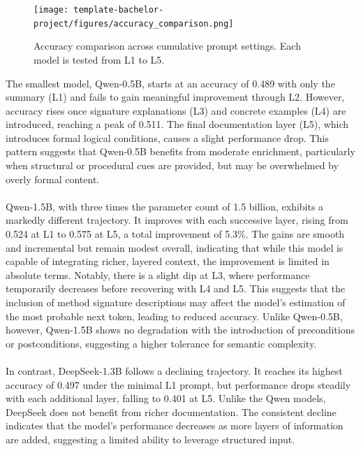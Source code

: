 \documentclass[a4paper]{usiinfbachelorproject}
\begin{document}
\begin{figure}[H]
  \centering
  \texttt{[image: template-bachelor-project/figures/accuracy\_comparison.png]}
  \caption{Accuracy comparison across cumulative prompt settings. Each model is tested from L1 to L5.}
  \label{fig:acc-l1-l5}
\end{figure}
\noindent
The smallest model, Qwen-0.5B, starts at an accuracy of 0.489 with only the summary (L1) and fails to gain meaningful improvement through L2. However, accuracy rises once signature explanations (L3) and concrete examples (L4) are introduced, reaching a peak of 0.511. The final documentation layer (L5), which introduces formal logical conditions, causes a slight performance drop. This pattern suggests that Qwen-0.5B benefits from moderate enrichment, particularly when structural or procedural cues are provided, but may be overwhelmed by overly formal content. \\
\\
Qwen-1.5B, with three times the parameter count of 1.5 billion, exhibits a markedly different trajectory. It improves with each successive layer, rising from 0.524 at L1 to 0.575 at L5, a total improvement of 5.3\%. The gains are smooth and incremental but remain modest overall, indicating that while this model is capable of integrating richer, layered context, the improvement is limited in absolute terms. Notably, there is a slight dip at L3, where performance temporarily decreases before recovering with L4 and L5. This suggests that the inclusion of method signature descriptions may affect the model’s estimation of the most probable next token, leading to reduced accuracy. Unlike Qwen-0.5B, however, Qwen-1.5B shows no degradation with the introduction of preconditions or postconditions, suggesting a higher tolerance for semantic complexity. \\
\\
In contrast, DeepSeek-1.3B follows a declining trajectory. It reaches its highest accuracy of 0.497 under the minimal L1 prompt, but performance drops steadily with each additional layer, falling to 0.401 at L5. Unlike the Qwen models, DeepSeek does not benefit from richer documentation. The consistent decline indicates that the model’s performance decreases as more layers of information are added, suggesting a limited ability to leverage structured input.
\end{document}

